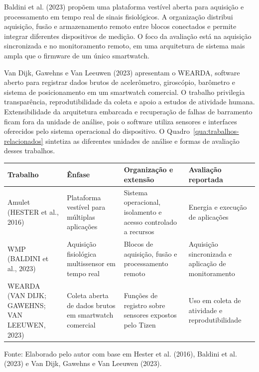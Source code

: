 \documentclass{article}
\newcommand{\fonteelemento}[1]{%
  \par\smallskip
  {\footnotesize\raggedright Fonte: #1.\par}%
}
\begin{document}
Baldini et al. (2023) prop\~oem uma plataforma vest\'ivel aberta para aquisi\c{c}\~ao e processamento em tempo real de sinais fisiol\'ogicos. A organiza\c{c}\~ao distribui aquisi\c{c}\~ao, fus\~ao e armazenamento remoto entre blocos conectados e permite integrar diferentes dispositivos de medi\c{c}\~ao. O foco da avalia\c{c}\~ao est\'a na aquisi\c{c}\~ao sincronizada e no monitoramento remoto, em uma arquitetura de sistema mais ampla que o firmware de um \'unico smartwatch.


Van Dijk, Gawehns e Van Leeuwen (2023) apresentam o WEARDA, software aberto para registrar dados brutos de aceler\^ometro, girosc\'opio, bar\^ometro e sistema de posicionamento em um smartwatch comercial. O trabalho privilegia transpar\^encia, reprodutibilidade da coleta e apoio a estudos de atividade humana. Extensibilidade da arquitetura embarcada e recupera\c{c}\~ao de falhas de barramento ficam fora da unidade de an\'alise, pois o software utiliza sensores e interfaces oferecidos pelo sistema operacional do dispositivo. O Quadro~\ref{qua:trabalhos-relacionados} sintetiza as diferentes unidades de an\'alise e formas de avalia\c{c}\~ao desses trabalhos.


\begin{quadro}[ht]
\centering
\caption{Compara\c{c}\~ao entre plataformas vest\'iveis relacionadas}
\label{qua:trabalhos-relacionados}
\small
\renewcommand{\arraystretch}{1.15}
\begin{tabularx}{\textwidth}{>{\raggedright\arraybackslash}p{}*{3}{>{\raggedright\arraybackslash}X}}
\toprule
\textbf{Trabalho} & \textbf{\^Enfase} & \textbf{Organiza\c{c}\~ao e extens\~ao} & \textbf{Avalia\c{c}\~ao reportada} \\
\midrule
Amulet (HESTER et al., 2016) & Plataforma vest\'ivel para m\'ultiplas aplica\c{c}\~oes & Sistema operacional, isolamento e acesso controlado a recursos & Energia e execu\c{c}\~ao de aplica\c{c}\~oes \\
\addlinespace
WMP (BALDINI et al., 2023) & Aquisi\c{c}\~ao fisiol\'ogica multissensor em tempo real & Blocos de aquisi\c{c}\~ao, fus\~ao e processamento remoto & Aquisi\c{c}\~ao sincronizada e aplica\c{c}\~ao de monitoramento \\
\addlinespace
WEARDA (VAN DIJK; GAWEHNS; VAN LEEUWEN, 2023) & Coleta aberta de dados brutos em smartwatch comercial & Fun\c{c}\~oes de registro sobre sensores expostos pelo Tizen & Uso em coleta de atividade e reprodutibilidade \\
\bottomrule
\end{tabularx}
\fonteelemento{Elaborado pelo autor com base em Hester et al. (2016), Baldini et al. (2023) e Van Dijk, Gawehns e Van Leeuwen (2023)}
\end{quadro}
\end{document}
